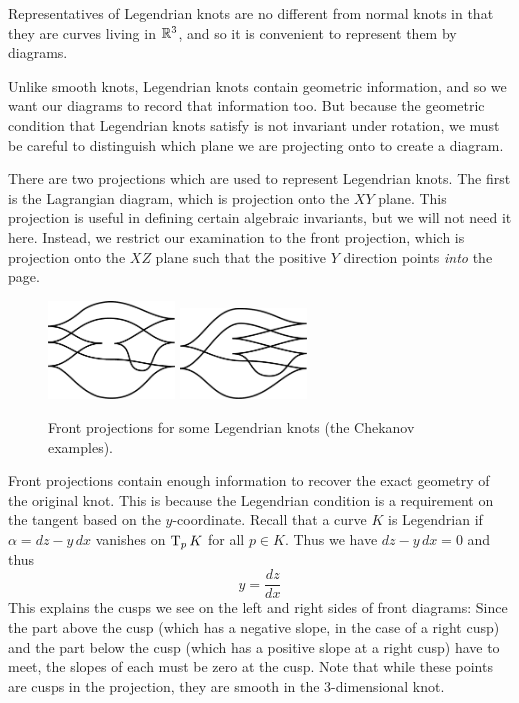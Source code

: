 Representatives of Legendrian knots are no different from normal knots in that they are curves living in $\mathbb{R}^3$, and so it is convenient to represent them by diagrams.

Unlike smooth knots, Legendrian knots contain geometric information, and so we want our diagrams to record that information too. But because the geometric condition that Legendrian knots satisfy is not invariant under rotation, we must be careful to distinguish which plane we are projecting onto to create a diagram.

There are two projections which are used to represent Legendrian knots. The first is the Lagrangian diagram, which is projection onto the $XY$ plane. This projection is useful in defining certain algebraic invariants, but we will not need it here.
Instead, we restrict our examination to the front projection, which is projection onto the $XZ$ plane such that the positive $Y$ direction points \emph{into} the page.

\begin{figure}[ht]
    \centering
    \includegraphics[width=0.3\textwidth]{images/chekanov-1.pdf}
    \hspace{2em}
    \includegraphics[width=0.3\textwidth]{images/chekanov-2.pdf}
    \caption{Front projections for some Legendrian knots (the Chekanov examples).}%
    \label{fig:front-projection}
\end{figure}

Front projections contain enough information to recover the exact geometry of the original knot. This is because the Legendrian condition is a requirement on the tangent based on the $y$-coordinate. Recall that a curve $K$ is Legendrian if $\alpha = dz - y\, dx$ vanishes on $\operatorname{T}_p K$ for all $p \in K$. Thus we have $dz - y \, dx = 0$ and thus
\[
    y = \frac{dz}{dx}
\]
This explains the cusps we see on the left and right sides of front diagrams: Since the part above the cusp (which has a negative slope, in the case of a right cusp) and the part below the cusp (which has a positive slope at a right cusp) have to meet, the slopes of each must be zero at the cusp. Note that while these points are cusps in the projection, they are smooth in the 3-dimensional knot.

